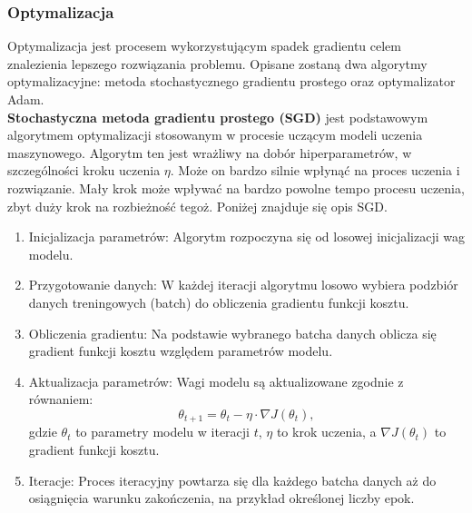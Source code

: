 \subsubsection{Optymalizacja}
\label{sec:optimization}
\par
Optymalizacja jest procesem wykorzystującym spadek gradientu celem znalezienia lepszego rozwiązania problemu. Opisane zostaną dwa algorytmy  optymalizacyjne: metoda stochastycznego gradientu prostego oraz optymalizator Adam.
\\

\textbf{Stochastyczna metoda gradientu prostego (SGD)} jest podstawowym algorytmem optymalizacji stosowanym w procesie uczącym modeli uczenia maszynowego. Algorytm ten jest wrażliwy na dobór hiperparametrów, w szczególności kroku uczenia $\eta$. Może on bardzo silnie wpłynąć na proces uczenia i rozwiązanie. Mały krok może wpływać na bardzo powolne tempo procesu uczenia, zbyt duży krok na rozbieżność tegoż. Poniżej znajduje się opis SGD.


\begin{enumerate}
    \item Inicjalizacja parametrów: Algorytm rozpoczyna się od losowej inicjalizacji wag modelu.
    
    \item Przygotowanie danych: W każdej iteracji algorytmu losowo wybiera podzbiór danych treningowych (batch) do obliczenia gradientu funkcji kosztu.
    
    \item Obliczenia gradientu: Na podstawie wybranego batcha danych oblicza się gradient funkcji kosztu względem parametrów modelu.
    
    \item Aktualizacja parametrów: Wagi modelu są aktualizowane zgodnie z równaniem:
    \begin{equation*}
        \theta_{t+1} = \theta_t - \eta \cdot \nabla J(\theta_t),
    \end{equation*}
    gdzie \(\theta_t\) to parametry modelu w iteracji \(t\), \(\eta\) to krok uczenia, a \(\nabla J(\theta_t)\) to gradient funkcji kosztu.
    
    \item Iteracje: Proces iteracyjny powtarza się dla każdego batcha danych aż do osiągnięcia warunku zakończenia, na przykład określonej liczby epok.
\end{enumerate}

\par
    

